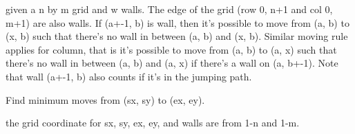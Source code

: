 given a n by m grid and w walls. The edge of the grid (row 0, n+1 and col 0, m+1) are also walls. If (a+-1, b) is wall, then it's possible to move from (a, b) to (x, b) such that there's no wall in between (a, b) and (x, b). Similar moving rule applies for column, that is it's possible to move from (a, b) to (a, x) such that there's no wall in between (a, b) and (a, x) if there's a wall on (a, b+-1). Note that wall (a+-1, b) also counts if it's in the jumping path.

Find minimum moves from (sx, sy) to (ex, ey).

the grid coordinate for sx, sy, ex, ey, and walls are from 1-n and 1-m.
